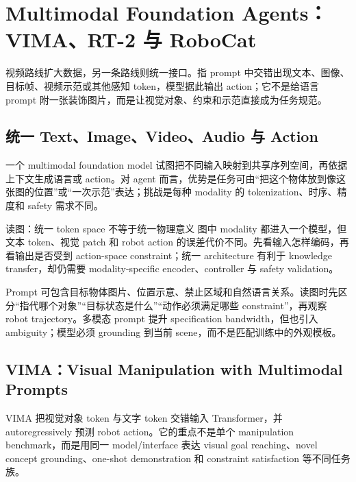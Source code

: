 \section{Multimodal Foundation Agents：VIMA、RT-2 与 RoboCat}

视频路线扩大数据，另一条路线则统一接口。指 prompt 中交错出现文本、图像、目标帧、视频示范或其他感知 token，模型据此输出 action；它不是给语言 prompt 附一张装饰图片，而是让视觉对象、约束和示范直接成为任务规范。

\subsection{统一 Text、Image、Video、Audio 与 Action}

一个 multimodal foundation model 试图把不同输入映射到共享序列空间，再依据上下文生成语言或 action。对 agent 而言，优势是任务可由“把这个物体放到像这张图的位置”或“一次示范”表达；挑战是每种 modality 的 tokenization、时序、精度和 safety 需求不同。


\begin{knowledgebox}{读图：统一 token space 不等于统一物理意义}
图中 modality 都进入一个模型，但文本 token、视觉 patch 和 robot action 的误差代价不同。先看输入怎样编码，再看输出是否受到 action-space constraint；统一 architecture 有利于 knowledge transfer，却仍需要 modality-specific encoder、controller 与 safety validation。
\end{knowledgebox}


Prompt 可包含目标物体图片、位置示意、禁止区域和自然语言关系。读图时先区分“指代哪个对象”“目标状态是什么”“动作必须满足哪些 constraint”，再观察 robot trajectory。多模态 prompt 提升 specification bandwidth，但也引入 ambiguity；模型必须 grounding 到当前 scene，而不是匹配训练中的外观模板。

\subsection{VIMA：Visual Manipulation with Multimodal Prompts}

VIMA 把视觉对象 token 与文字 token 交错输入 Transformer，并 autoregressively 预测 robot action。它的重点不是单个 manipulation benchmark，而是用同一 model/interface 表达 visual goal reaching、novel concept grounding、one-shot demonstration 和 constraint satisfaction 等不同任务族。

